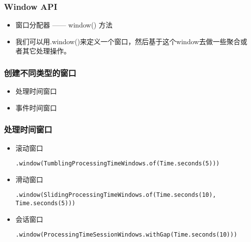 \documentclass{beamer}
\begin{document}
  \begin{frame}
      \frametitle{Window API}
  
      \begin{itemize}
          \item 窗口分配器 —— window() 方法
          \item 我们可以用.window()来定义一个窗口，然后基于这个window去做一些聚合或者其它处理操作。
      \end{itemize}
  
  \end{frame}

  \begin{frame}
      \frametitle{创建不同类型的窗口}
  
      \begin{itemize}
          \item 处理时间窗口
          \item 事件时间窗口
      \end{itemize}
  
  \end{frame}

  \begin{frame}[fragile]
      \frametitle{处理时间窗口}
  
      \begin{itemize}
          \item 滚动窗口
            \begin{verbatim}
.window(TumblingProcessingTimeWindows.of(Time.seconds(5)))
            \end{verbatim}
          \item 滑动窗口
            \begin{verbatim}
.window(SlidingProcessingTimeWindows.of(Time.seconds(10), Time.seconds(5)))
            \end{verbatim}
          \item 会话窗口
            \begin{verbatim}
.window(ProcessingTimeSessionWindows.withGap(Time.seconds(10)))
            \end{verbatim}
      \end{itemize}
  
  \end{frame}
\end{document}
